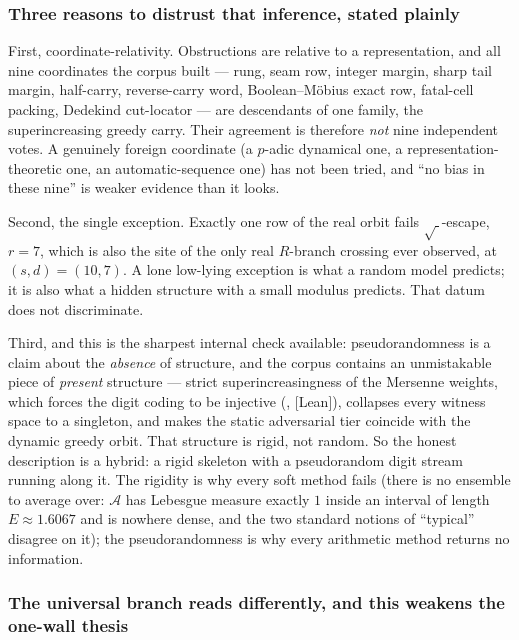 \documentclass[11pt]{article}
\theoremstyle{plain}
\theoremstyle{definition}
\theoremstyle{remark}
\newcommand{\lean}[2]{\leanlink{#2}}
\newcommand{\ev}[1]{{\small\textsf{[#1]}}\xspace}
\begin{document}
\subsubsection*{Three reasons to distrust that inference, stated plainly}

First, coordinate-relativity. Obstructions are relative to a representation, and all nine
coordinates the corpus built --- rung, seam row, integer margin, sharp tail margin, half-carry,
reverse-carry word, Boolean--M\"obius exact row, fatal-cell packing, Dedekind cut-locator --- are
descendants of one family, the superincreasing greedy carry. Their agreement is therefore
\emph{not} nine independent votes. A genuinely foreign coordinate (a $p$-adic dynamical one, a
representation-theoretic one, an automatic-sequence one) has not been tried, and ``no bias in
these nine'' is weaker evidence than it looks.

Second, the single exception. Exactly one row of the real orbit fails $\sqrt{\ }$-escape, $r=7$,
which is also the site of the only real $R$-branch crossing ever observed, at $(s,d)=(10,7)$. A
lone low-lying exception is what a random model predicts; it is also what a hidden structure with
a small modulus predicts. That datum does not discriminate.

Third, and this is the sharpest internal check available: pseudorandomness is a claim about the
\emph{absence} of structure, and the corpus contains an unmistakable piece of \emph{present}
structure --- strict superincreasingness of the Mersenne weights, which forces the digit coding to
be injective (\lean{positiveMersenneDigitValue_injective}{GreedyAchievementSet.lean:1582},
\ev{Lean}), collapses every witness space to a singleton, and makes the static adversarial tier
coincide with the dynamic greedy orbit. That structure is rigid, not random. So the honest
description is a hybrid: a rigid skeleton with a pseudorandom digit stream running along it. The
rigidity is why every soft method fails (there is no ensemble to average over: $\mathcal{A}$ has
Lebesgue measure exactly $1$ inside an interval of length $E\approx1.6067$ and is nowhere dense,
and the two standard notions of ``typical''
disagree on it); the pseudorandomness is why every arithmetic method returns no information.

\subsubsection*{The universal branch reads differently, and this weakens the one-wall thesis}
\end{document}
